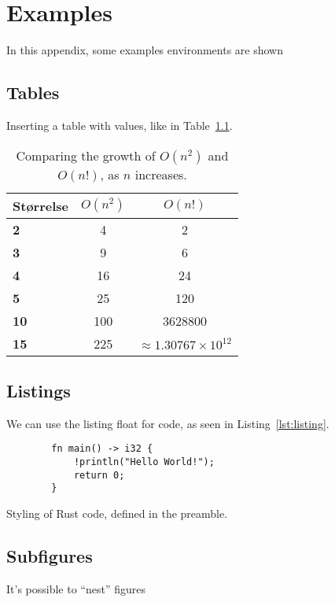 \chapter{Examples}\label{app:examples}
In this appendix, some examples environments are shown

\section{Tables}
Inserting a table with values, like in Table~\ref{tab:table}.

\begin{table}[htb!]
    \centering
    \begin{tabular}{>{\bfseries}lcc}
        \toprule
        Størrelse   & $O(n^2)$  & $O(n!)$ \\
        \midrule
        2           & 4         & 2 \\
        3           & 9         & 6 \\
        4           & 16        & 24 \\
        5           & 25        & 120 \\
        10          & 100       & 3628800 \\
        15          & 225       & $\approx 1.30767 \times 10^{12}$ \\
        \bottomrule
    \end{tabular}
    \caption{Comparing the growth of $O(n^2)$ and $O(n!)$, as $n$ increases.}
    \label{tab:table}
\end{table}


\section{Listings}
We can use the listing float for code, as seen in Listing~\ref{lst:listing}.

\begin{listing}[htb!]
    \begin{verbatim}
        fn main() -> i32 {
            !println("Hello World!");
            return 0;
        }
    \end{verbatim}
    \caption{Styling of Rust code, defined in the preamble.}
    \label{lst:listing}
\end{listing}

\clearpage

\section{Subfigures}
It's possible to ``nest'' figures

